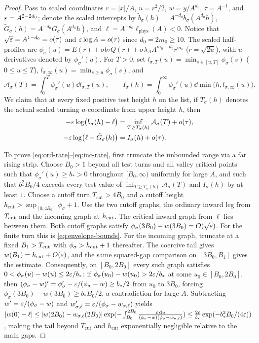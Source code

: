 \begin{proof}
Pass to scaled coordinates $r=|x|/A$, $u=r^2/2$, $w=y/A^{d_0}$, $\tau=A^{-1}$, and $\varepsilon=A^{2-2d_0}$;
denote the scaled intercepts by $\tilde{b}_\sigma(h)=A^{-d_0}b_\sigma(A^{d_0}h)$,
$\tilde{G}_\sigma(h)=A^{-d_0}G_\sigma(A^{d_0}h)$, and $\ell=A^{-d_0}\ell_{\mathrm{phys}}(A)<0$. Notice
that $\sqrt{\varepsilon}=A^{1-d_0}=o(\tau)$ and $\varepsilon\log A=o(\tau)$ since $d_0=2m_0\ge 10$. The scaled
half-profiles are $\phi_\sigma(u)=E(r)+\sigma b\tau Q(r)+\sigma\lambda_A A^{m_0-d_0}r^{m_0}$
($r=\sqrt{2u}$), with $u$-derivatives denoted by $\phi_\sigma'(u)$. For $T>0$, set
$l_{\sigma,T}(u)=\min_{s\in[u,T]}\phi_\sigma(s)$ ($0\le u\le T$), $l_{\sigma,\infty}(u)=\min_{s\ge
u}\phi_\sigma(s)$, and
\[
  \mathcal{A}_\sigma(T) = \int_0^T \phi_\sigma'(u)\dd l_{\sigma,T}(u), \qquad I_\sigma(h) =
  \int_0^\infty \phi_\sigma'(u)\dd\min\bigl(h,l_{\sigma,\infty}(u)\bigr).
\]
We claim that at every fixed positive test height $h$ on the list, if $T_\sigma(h)$ denotes the actual
scaled turning $u$-coordinate from upper height $h$, then
\begin{align}
  -\varepsilon\log\bigl(\tilde{b}_\sigma(h) - \ell\bigr) &= \inf_{T\ge T_\sigma(h)} \mathcal{A}_\sigma(T) + o(\tau), \label{eq:ord-rate}\\
  -\varepsilon\log\bigl(\ell - \tilde{G}_\sigma(h)\bigr) &= I_\sigma(h) + o(\tau). \label{eq:inc-rate}
\end{align}

To prove \eqref{eq:ord-rate}--\eqref{eq:inc-rate}, first truncate the unbounded range via a far rising
strip. Choose $B_0>1$ beyond all test turns and all valley critical points such that
$\phi_\sigma'(u)\ge b_* > 0$ throughout $[B_0,\infty)$ uniformly for large $A$, and such that $b_*^2
B_0/4$ exceeds every test value of $\inf_{T\ge T_\sigma(h)}\mathcal{A}_\sigma(T)$ and $I_\sigma(h)$ by
at least $1$. Choose a cutoff turn $T_{\mathrm{cut}}>4B_0$ and a cutoff height
$h_{\mathrm{cut}}>\sup_{[0,4B_0]}\phi_\sigma+1$. Use the two cutoff graphs, the ordinary inward leg
from $T_{\rm cut}$
and the incoming graph at $h_{\rm cut}$. The critical inward graph from
$\ell$ lies between them. Both cutoff graphs satisfy
$\phi_\sigma(3B_0)-w(3B_0)=O(\sqrt{\varepsilon})$. For the finite turn this is
\eqref{eq:envelope-bounds}. For the incoming graph, truncate at a fixed
$B_1>T_{\rm cut}$ with $\phi_\sigma>h_{\rm cut}+1$ thereafter.
The coercive tail gives $w(B_1)=h_{\rm cut}+O(\varepsilon)$, and the same
squared-gap comparison on $[3B_0,B_1]$ gives the estimate. Consequently, on $[B_0,2B_0]$ every such
graph satisfies $0<\phi_\sigma(u)-w(u)\le 2\varepsilon/b_*$: if $\phi_\sigma(u_0)-w(u_0)>2\varepsilon/b_*$ at some
$u_0\in[B_0,2B_0]$, then $(\phi_\sigma-w)'=\phi_\sigma'-\varepsilon/(\phi_\sigma-w)\ge b_*/2$ from $u_0$ to
$3B_0$, forcing $\phi_\sigma(3B_0)-w(3B_0)\ge b_* B_0/2$, a contradiction for large $A$. Subtracting
$w'=\varepsilon/(\phi_\sigma-w)$ and $w_{\sigma,\ell}'=\varepsilon/(\phi_\sigma-w_{\sigma,\ell})$ yields
$|w(0)-\ell|\le |w(2B_0)-w_{\sigma,\ell}(2B_0)|\exp(-\int_{B_0}^{2B_0}\frac{\varepsilon\,\mathrm{d}
u}{(\phi_\sigma-w)(\phi_\sigma-w_{\sigma,\ell})}) \le \frac{2\varepsilon}{b_*}\exp(-b_*^2 B_0/(4\varepsilon))$,
making the tail beyond $T_{\mathrm{cut}}$ and $h_{\mathrm{cut}}$ exponentially negligible relative to
the main gaps.


\end{proof}
